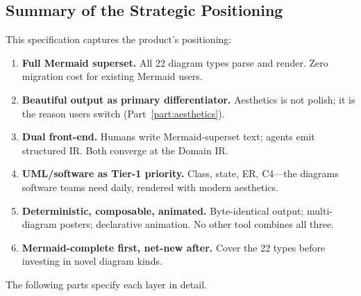 \subsection{Summary of the Strategic Positioning}

This specification captures the product's positioning:

\begin{enumerate}
  \item \textbf{Full Mermaid superset.} All 22 diagram types parse and render.
        Zero migration cost for existing Mermaid users.

  \item \textbf{Beautiful output as primary differentiator.} Aesthetics is not polish;
        it is the reason users switch (Part~\ref{part:aesthetics}).

  \item \textbf{Dual front-end.} Humans write Mermaid-superset text; agents emit structured IR.
        Both converge at the Domain IR.

  \item \textbf{UML/software as Tier-1 priority.} Class, state, ER, C4---the diagrams
        software teams need daily, rendered with modern aesthetics.

  \item \textbf{Deterministic, composable, animated.} Byte-identical output; multi-diagram
        posters; declarative animation. No other tool combines all three.

  \item \textbf{Mermaid-complete first, net-new after.} Cover the 22 types before investing
        in novel diagram kinds.
\end{enumerate}

The following parts specify each layer in detail.
